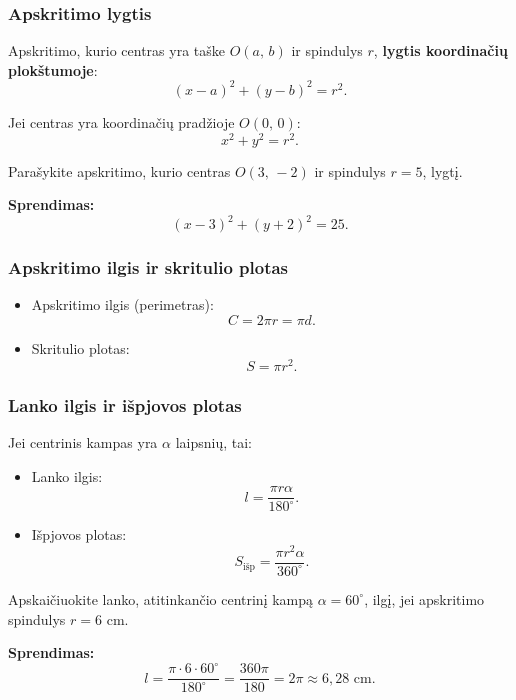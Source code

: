 \subsubsection*{Apskritimo lygtis}

Apskritimo, kurio centras yra taške $O(a,\, b)$ ir spindulys $r$, \textbf{lygtis koordinačių plokštumoje}:
\[
(x - a)^2 + (y - b)^2 = r^2.
\]

Jei centras yra koordinačių pradžioje $O(0,\, 0)$:
\[
x^2 + y^2 = r^2.
\]

\begin{example}
Parašykite apskritimo, kurio centras $O(3,\,-2)$ ir spindulys $r = 5$, lygtį.

\textbf{Sprendimas:}
\[
(x-3)^2 + (y+2)^2 = 25.
\]
\end{example}

\subsubsection*{Apskritimo ilgis ir skritulio plotas}

\begin{tcolorbox}[colback=blue!5!white, colframe=blue!60!black, title=Formulės]
\begin{itemize}
  \item Apskritimo ilgis (perimetras):
  \[
  C = 2\pi r = \pi d.
  \]
  \item Skritulio plotas:
  \[
  S = \pi r^2.
  \]
\end{itemize}
\end{tcolorbox}

\subsubsection*{Lanko ilgis ir išpjovos plotas}

Jei centrinis kampas yra $\alpha$ laipsnių, tai:

\begin{tcolorbox}[colback=green!5!white, colframe=green!60!black, title=Formulės]
\begin{itemize}
  \item Lanko ilgis:
  \[
  l = \frac{\pi r \alpha}{180^{\circ}}.
  \]
  \item Išpjovos plotas:
  \[
  S_{\text{išp}} = \frac{\pi r^2 \alpha}{360^{\circ}}.
  \]
\end{itemize}
\end{tcolorbox}

\begin{example}
Apskaičiuokite lanko, atitinkančio centrinį kampą $\alpha = 60^\circ$, ilgį, jei apskritimo spindulys $r = 6$ cm.

\textbf{Sprendimas:}
\[
l = \frac{\pi \cdot 6 \cdot 60^{\circ}}{180^{\circ}} = \frac{360\pi}{180} = 2\pi \approx 6{,}28 \text{ cm}.
\]
\end{example}


